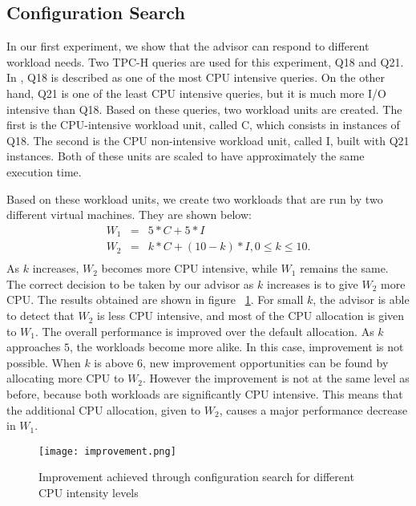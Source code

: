 \subsection{Configuration Search}

In our first experiment, we show that the advisor can respond to different workload needs. Two TPC-H queries are used for this experiment, Q18 and Q21. In \cite{Soror:2008:AVM:1376616.1376711}, Q18 is described as one of the most CPU intensive queries. On the other hand, Q21 is one of the least CPU intensive queries, but it is much more I/O intensive than Q18. Based on these queries, two workload units are created. The first is the CPU-intensive workload unit, called C, which consists in instances of Q18. The second is the CPU non-intensive workload unit, called I, built with Q21 instances. Both of these units are scaled to have approximately the same execution time.

Based on these workload units, we create two workloads that are run by two different virtual machines. They are shown below:
\begin{eqnarray*}
 W_{1} &=& 5*C + 5*I \\
 W_{2} &=& k*C + (10-k)*I, 0 \leq k \leq 10. \\
\end{eqnarray*}
As $k$ increases, $W_{2}$ becomes more CPU intensive, while $W_{1}$ remains the same. The correct decision to be taken by our advisor as $k$ increases is to give $W_{2}$ more CPU. The results obtained are shown in figure ~\ref{fig:intensity}. For small $k$, the advisor is able to detect that $W_{2}$ is less CPU intensive, and most of the CPU allocation is given to $W_{1}$. The overall performance is improved  over the default allocation. As $k$ approaches $5$, the workloads become more alike. In this case, improvement is not possible. When $k$ is above $6$, new improvement  opportunities can be found by allocating more CPU to $W_{2}$. However the improvement is not at the same level as before, because both workloads are significantly CPU intensive. This means that the additional CPU allocation, given to $W_{2}$, causes a major performance decrease in $W_{1}$.

\begin{figure}[ht]
 \centering
 \texttt{[image: improvement.png]}
 \caption{Improvement achieved through configuration search for different CPU intensity levels}
 \label{fig:intensity}
\end{figure} 


